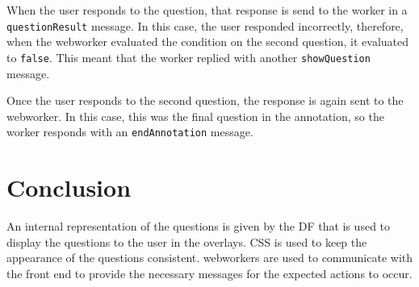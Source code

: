 When the user responds to the question, that response is send to the worker in a \lstinline|questionResult| message. In this case, the user responded incorrectly, therefore, when the \gls{webworker} evaluated the condition on the second question, it evaluated to \lstinline|false|. This meant that the worker replied with another \lstinline|showQuestion| message.

Once the user responds to the second question, the response is again sent to the \gls{webworker}. In this case, this was the final question in the annotation, so the worker responds with an \lstinline|endAnnotation| message.

\section{Conclusion}
An internal representation of the questions is given by the \acrlong{DF} that is used to display the questions to the user in the overlays. \gls{CSS} is used to keep the appearance of the questions consistent. \Glspl{webworker} are used to communicate with the front end to provide the necessary messages for the expected actions to occur.